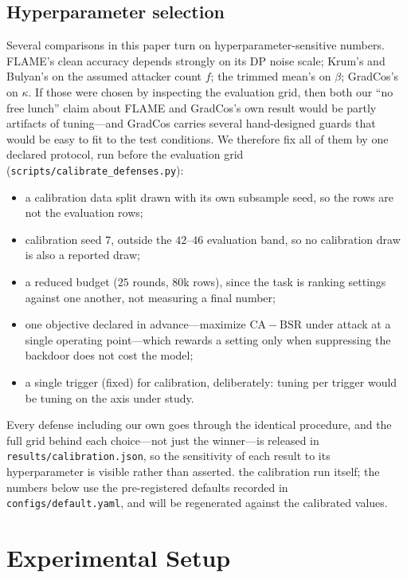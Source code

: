 \subsection{Hyperparameter selection}
\label{sec:tuning}

Several comparisons in this paper turn on hyperparameter-sensitive numbers.
FLAME's clean accuracy depends strongly on its DP noise scale; Krum's and
Bulyan's on the assumed attacker count $f$; the trimmed mean's on $\beta$;
GradCos's on $\kappa$. If those were chosen by inspecting the evaluation grid,
then both our ``no free lunch'' claim about FLAME and GradCos's own result would
be partly artifacts of tuning---and GradCos carries several hand-designed guards
that would be easy to fit to the test conditions. We therefore fix all of them by
one declared protocol, run before the evaluation grid
(\texttt{scripts/calibrate\_defenses.py}):

\begin{itemize}
\item a calibration data split drawn with its own subsample seed, so the rows are
not the evaluation rows;
\item calibration seed $7$, outside the $42$--$46$ evaluation band, so no
calibration draw is also a reported draw;
\item a reduced budget ($25$ rounds, $80$k rows), since the task is ranking
settings against one another, not measuring a final number;
\item one objective declared in advance---maximize $\mathrm{CA}-\mathrm{BSR}$
under attack at a single operating point---which rewards a setting only when
suppressing the backdoor does not cost the model;
\item a single trigger (fixed) for calibration, deliberately: tuning per trigger
would be tuning on the axis under study.
\end{itemize}

Every defense including our own goes through the identical procedure, and the
full grid behind each choice---not just the winner---is released in
\texttt{results/calibration.json}, so the sensitivity of each result to its
hyperparameter is visible rather than asserted. \PENDING{} the calibration run
itself; the numbers below use the pre-registered defaults recorded in
\texttt{configs/default.yaml}, and will be regenerated against the calibrated
values.

\section{Experimental Setup}
\label{sec:setup}

